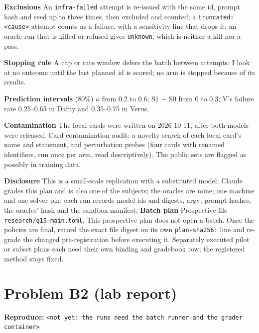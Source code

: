 \documentclass[11pt]{article}
\begin{document}
\begin{answer}
\textbf{Exclusions} An \texttt{infra-failed} attempt is re-issued with the
same id, prompt hash and seed up to three times, then excluded and counted; a
\texttt{truncated:<cause>} attempt counts as a failure, with a sensitivity
line that drops it; an oracle run that is killed or refused gives
\texttt{unknown}, which is neither a kill nor a pass.

\textbf{Stopping rule} A cap or rate window defers the batch between attempts;
I look at no outcome until the last planned id is scored; no arm is stopped
because of its results.

\textbf{Prediction intervals} (80\%) $\kappa$ from 0.2 to 0.6; S1 $-$ S0
from 0 to 0.3; V's failure rate 0.25--0.65 in Dafny and 0.35--0.75 in Verus.

\textbf{Contamination} The local cards were written on 2026-10-11, after both
models were released. Card contamination audit: a novelty search of each
local card's name and statement, and perturbation probes (four cards with
renamed identifiers, run once per arm, read descriptively). The public sets
are flagged as possibly in training data.

\textbf{Disclosure} This is a small-scale replication with a substituted
model; Claude grades this plan and is also one of the subjects; the oracles are
mine; one machine and one solver pin; each run records model ids and digests,
argv, prompt hashes, the oracles' hash and the sandbox manifest.
\textbf{Batch plan} Prospective file \texttt{research/q15-main.toml}.
This prospective plan does not open a batch. Once the policies are final,
record the exact file digest on its own \texttt{plan-sha256:} line and
re-grade the changed pre-registration before executing it. Separately
executed pilot or subset plans each need their own binding and gradebook
row; the registered method stays fixed.
\end{answer}

\section*{Problem B2 (lab report)}\label{ans:B2}
\begin{answer}
\textbf{Reproduce:} \verb+<not yet: the runs need the batch runner and the grader container>+
\end{answer}

\end{document}
